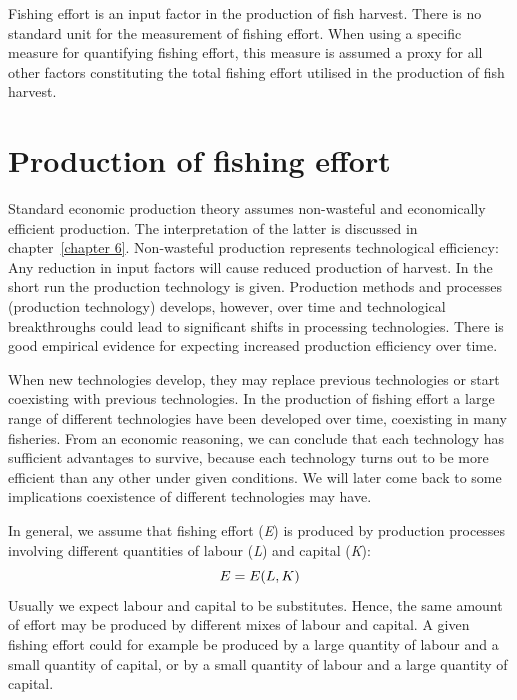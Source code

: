 \documentclass[11pt,fleqn]{book} %
\begin{document}
\begin{definition}
Fishing effort is an input factor in the production of fish harvest. There is no standard unit for the measurement of fishing effort. When using a specific measure for quantifying fishing effort, this measure is assumed a proxy for all other factors constituting the total fishing effort utilised in the production of fish harvest.
\end{definition}

\section{Production of fishing effort}\label{fishing effort}

Standard economic production theory assumes non-wasteful and economically efficient production. The interpretation of the latter is discussed in chapter~\ref{chapter 6}. Non-wasteful production represents technological efficiency: Any reduction in input factors will cause reduced production of harvest. In the short run the production technology is given. Production methods and processes (production technology) develops, however, over time and technological breakthroughs could lead to significant shifts in processing technologies. There is good empirical evidence for expecting increased production efficiency over time.

When new technologies develop, they may replace previous technologies or start coexisting with previous technologies. In the production of fishing effort a large range of different technologies have been developed over time, coexisting in many fisheries. From an economic reasoning, we can conclude that each technology has sufficient advantages to survive, because each technology turns out to be more efficient than any other under given conditions. We will later come back to some implications coexistence of different technologies may have.

In general, we assume that fishing effort (\textit{E}) is produced by production processes involving different quantities of labour (\textit{L}) and capital (\textit{K}):
\begin{equation} 
\label{eq:production}
\index{Production functions}
E = E(L,K)
\end{equation}
Usually we expect labour and capital to be substitutes. Hence, the same amount of effort may be produced by different mixes of labour and capital. A given fishing effort could for example be produced by a large quantity of labour and a small quantity of capital, or by a small quantity of labour and a large quantity of capital.
\end{document}
